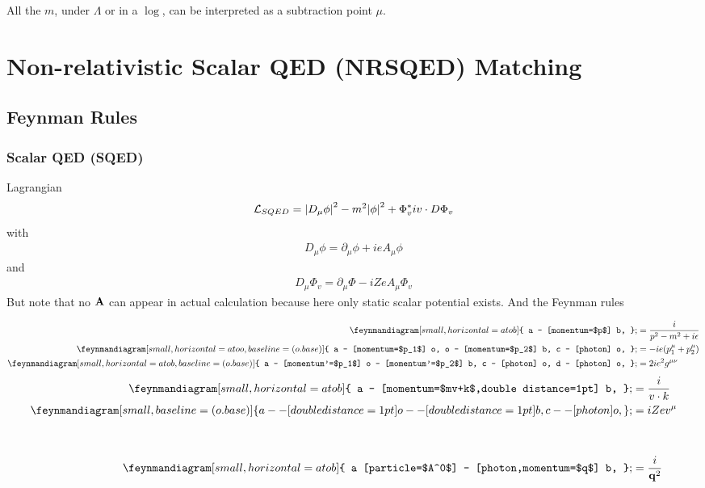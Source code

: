\documentclass{article}
\newcommand{\lag}{\mathcal{L}}
\begin{document}
All the $m$, under $\Lambda$ or in a $\log$, can be interpreted as a subtraction point $\mu$.

\section{Non-relativistic Scalar QED (NRSQED) Matching}
\subsection{Feynman Rules}
\subsubsection{Scalar QED (SQED)}
Lagrangian
\begin{align}
	\lag_{SQED}=\abs{D_{\mu}\phi}^2-m^2\abs{\phi}^2+\Phi_v^*iv\cdot D\Phi_v
	\label{SQEDLAG}
\end{align}
with
\begin{align*}
	D_{\mu}\phi=\partial_{\mu}\phi+ieA_{\mu}\phi
\end{align*}
and
\begin{align*}
	D_{\mu}\Phi_v=\partial_{\mu}\Phi-iZeA_{\mu}\Phi_v
\end{align*}
But note that no $\vb{A}$ can appear in actual calculation because here only static scalar potential exists.
And the Feynman rules
\clearpage
\begin{multicols}{2}
	\begin{align*}
		\feynmandiagram[small,horizontal=a to b]{
		a -- [momentum=$p$] b,
		}; & =\frac{i}{p^2-m^2+i\epsilon} \\
		\feynmandiagram[small,horizontal=a to o,baseline=(o.base)]{
		a -- [momentum=$p_1$] o,
		o -- [momentum=$p_2$] b,
		c -- [photon] o,
		}; & =-ie(p_1^{\mu}+p_2^{\mu})    \\
		\feynmandiagram[small,horizontal=a to b,baseline=(o.base)]{
		a -- [momentum'=$p_1$] o -- [momentum'=$p_2$] b,
		c -- [photon] o,
		d -- [photon] o,
		}; & =2ie^2g^{\mu\nu}
	\end{align*}
	\begin{align*}
		\feynmandiagram[small,horizontal=a to b]{
		a -- [momentum=$mv+k$,double distance=1pt] b,
		}; & =\frac{i}{v\cdot k} \\
		\feynmandiagram[small,baseline=(o.base)]{
		a -- [double distance=1pt] o -- [double distance=1pt] b,
		c -- [photon] o,
		}; & =iZev^{\mu}         \\\\\\
		\feynmandiagram[small,horizontal=a to b]{
		a [particle=$A^0$] -- [photon,momentum=$q$] b,
		}; & =\frac{i}{\vb{q}^2}
	\end{align*}
\end{multicols}
\end{document}
